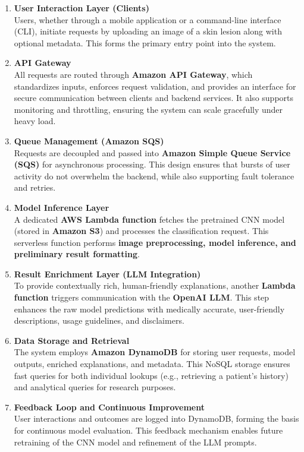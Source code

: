 \documentclass[
  12pt,
  oneside]{article}
\begin{document}
\begin{enumerate}
\def\labelenumi{\arabic{enumi}.}
\item
  \textbf{User Interaction Layer (Clients)}\\
  Users, whether through a mobile application or a command-line
  interface (CLI), initiate requests by uploading an image of a skin
  lesion along with optional metadata. This forms the primary entry
  point into the system.
\item
  \textbf{API Gateway}\\
  All requests are routed through \textbf{Amazon API Gateway}, which
  standardizes inputs, enforces request validation, and provides an
  interface for secure communication between clients and backend
  services. It also supports monitoring and throttling, ensuring the
  system can scale gracefully under heavy load.
\item
  \textbf{Queue Management (Amazon SQS)}\\
  Requests are decoupled and passed into \textbf{Amazon Simple Queue
  Service (SQS)} for asynchronous processing. This design ensures that
  bursts of user activity do not overwhelm the backend, while also
  supporting fault tolerance and retries.
\item
  \textbf{Model Inference Layer}\\
  A dedicated \textbf{AWS Lambda function} fetches the pretrained CNN
  model (stored in \textbf{Amazon S3}) and processes the classification
  request. This serverless function performs \textbf{image
  preprocessing, model inference, and preliminary result formatting}.
\item
  \textbf{Result Enrichment Layer (LLM Integration)}\\
  To provide contextually rich, human-friendly explanations, another
  \textbf{Lambda function} triggers communication with the
  \textbf{OpenAI LLM}. This step enhances the raw model predictions with
  medically accurate, user-friendly descriptions, usage guidelines, and
  disclaimers.
\item
  \textbf{Data Storage and Retrieval}\\
  The system employs \textbf{Amazon DynamoDB} for storing user requests,
  model outputs, enriched explanations, and metadata. This NoSQL storage
  ensures fast queries for both individual lookups (e.g., retrieving a
  patient's history) and analytical queries for research purposes.
\item
  \textbf{Feedback Loop and Continuous Improvement}\\
  User interactions and outcomes are logged into DynamoDB, forming the
  basis for continuous model evaluation. This feedback mechanism enables
  future retraining of the CNN model and refinement of the LLM prompts.
\end{enumerate}
\end{document}
